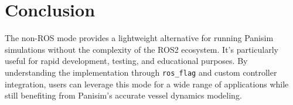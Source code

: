 \documentclass[
  letterpaper,
  DIV=11,
  numbers=noendperiod]{scrreprt}
\begin{document}
\section*{Conclusion}\label{conclusion-1}


The non-ROS mode provides a lightweight alternative for running Panisim
simulations without the complexity of the ROS2 ecosystem. It's
particularly useful for rapid development, testing, and educational
purposes. By understanding the implementation through \texttt{ros\_flag}
and custom controller integration, users can leverage this mode for a
wide range of applications while still benefiting from Panisim's
accurate vessel dynamics modeling.
\end{document}
